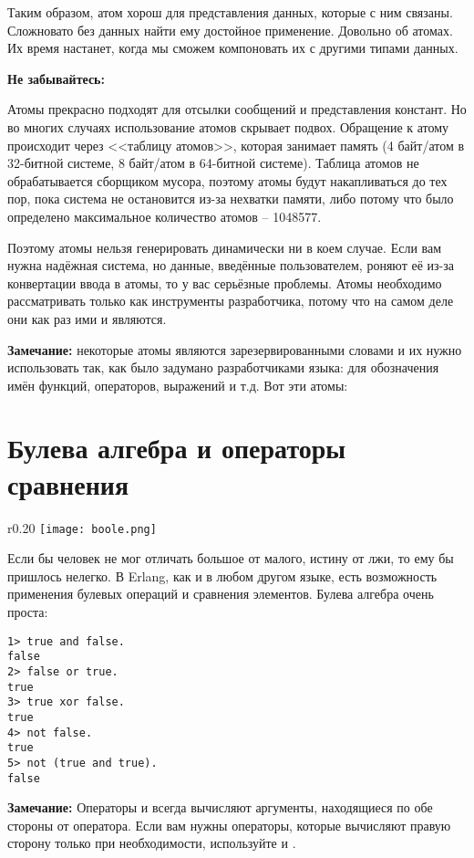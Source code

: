 Таким образом, атом хорош для представления данных, которые с ним связаны.
Сложновато без данных найти ему достойное применение.
Довольно об атомах.
Их время настанет, когда мы сможем компоновать их с другими типами данных.\\ 
\colorbox{lorange}
{
    \begin{minipage}{1.0\linewidth}
\textbf{Не забывайтесь:}

Атомы прекрасно подходят для отсылки сообщений и представления констант.
Но во многих случаях использование атомов скрывает подвох.
Обращение к атому происходит через <<таблицу атомов>>, которая занимает память (4 байт/атом в 32\--битной системе, 8 байт/атом в 64\--битной системе).
Таблица атомов не обрабатывается сборщиком мусора, поэтому атомы будут накапливаться до тех пор, пока система не остановится из\--за нехватки памяти, либо потому что было определено максимальное количество атомов \--- 1048577.

Поэтому атомы нельзя генерировать динамически ни в коем случае.
Если вам нужна надёжная система, но данные, введённые пользователем, роняют её из\--за конвертации ввода в атомы, то у вас серьёзные проблемы.
Атомы необходимо рассматривать только как инструменты разработчика, потому что на самом деле они как раз ими и являются.
\end{minipage}
}
\colorbox{lgray}{
    \begin{minipage}{1.0\linewidth}
    \textbf{Замечание:} некоторые атомы являются зарезервированными словами и их нужно использовать так, как было задумано разработчиками языка: для обозначения имён функций, операторов, выражений и т.д.
    Вот эти атомы: 
\end{minipage}
}
\section{Булева алгебра и операторы сравнения}\label{boolandcompare}
\begin{wrapfigure}[7]{r}{0.20\linewidth}
    \texttt{[image: boole.png]}
\end{wrapfigure}
Если бы человек не мог отличать большое от малого, истину от лжи, то ему бы пришлось нелегко.
В Erlang, как и в любом другом языке, есть возможность применения булевых операций и сравнения элементов.
Булева алгебра очень проста:\\ 
\begin{lstlisting}[style=repl]
1> true and false.
false
2> false or true.
true
3> true xor false.
true
4> not false.
true
5> not (true and true).
false
\end{lstlisting} 
\colorbox{lgray}
{
    \begin{minipage}{1.0\linewidth}
        \textbf{Замечание:} Операторы  и  всегда вычисляют аргументы, находящиеся по обе стороны от оператора.
        Если вам нужны операторы, которые вычисляют правую сторону только при необходимости, используйте  и .
    \end{minipage}
} 

